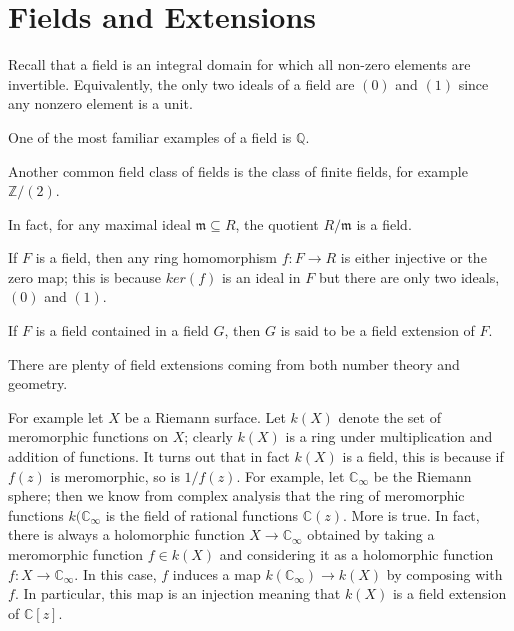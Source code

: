 \chapter{Fields and Extensions}
Recall that a field is an integral domain for which all non-zero elements are
invertible. Equivalently, the only two ideals of a field are $(0)$ and $(1)$
since any nonzero element is a unit.
\begin{example}
One of the most familiar examples of a field is $\mathbb{Q}$. \end{example}
\begin{example}
Another common field class of fields is the class of finite fields, for example
$\mathbb{Z}/(2)$.\end{example}
\begin{exercise} In fact, for any maximal ideal $\mathfrak{m}\subseteq R$, the
quotient $R/\mathfrak{m}$ is a field. \end{exercise}
\begin{example} If $F$ is a field, then any ring homomorphism $f:F\rightarrow R$
is either injective or the zero map; this is because $ker(f)$ is an ideal in $F$
but there are only two ideals, $(0)$ and $(1)$. \end{example}

\begin{definition} If $F$ is a field contained in a field $G$, then $G$ is said
to be a field extension of $F$. \end{definition}
There are plenty of field extensions coming from both number theory and
geometry.
\begin{example} For example let $X$ be a Riemann surface. Let $k(X)$ denote the
set of meromorphic functions on $X$; clearly $k(X)$ is a ring under
multiplication and addition of functions. It turns out that in fact $k(X)$ is a
field, this is because if $f(z)$ is meromorphic, so is $1/f(z)$. For example,
let $\mathbb{C}_{\infty}$ be the Riemann sphere; then we know from complex
analysis that the ring of meromorphic functions $k(\mathbb{C}_{\infty}$ is the
field of rational functions $\mathbb{C}(z)$. More is true. In fact, there is
always a holomorphic function $X\rightarrow \mathbb{C}_{\infty}$ obtained by
taking a meromorphic function $f\in k(X)$ and considering it as a holomorphic
function $f:X\rightarrow\mathbb{C}_{\infty}$. In this case, $f$ induces a map
$k(\mathbb{C}_{\infty})\rightarrow k(X)$ by composing with $f$. In particular,
this map is an injection meaning that $k(X)$ is a field extension of
$\mathbb{C}[z]$.
\end{example}

